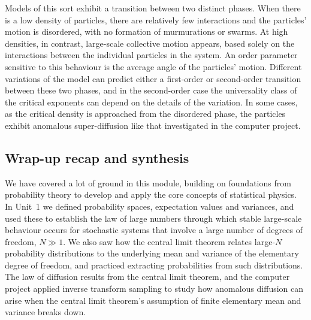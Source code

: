 Models of this sort exhibit a transition between two distinct phases.
When there is a low density of particles, there are relatively few interactions and the particles' motion is disordered, with no formation of murmurations or swarms.
At high densities, in contrast, large-scale collective motion appears, based solely on the interactions between the individual particles in the system.
An order parameter sensitive to this behaviour is the average angle of the particles' motion.
Different variations of the model can predict either a first-order or second-order transition between these two phases, and in the second-order case the universality class of the critical exponents can depend on the details of the variation. %
In some cases, as the critical density is approached from the disordered phase, the particles exhibit anomalous super-diffusion like that investigated in the computer project. %



\subsection{Wrap-up recap and synthesis}
We have covered a lot of ground in this module, building on foundations from probability theory to develop and apply the core concepts of statistical physics.
In Unit~1 we defined probability spaces, expectation values and variances, and used these to establish the law of large numbers through which stable large-scale behaviour occurs for stochastic systems that involve a large number of degrees of freedom, $N \gg 1$.
We also saw how the central limit theorem relates large-$N$ probability distributions to the underlying mean and variance of the elementary degree of freedom, and practiced extracting probabilities from such distributions.
The law of diffusion results from the central limit theorem, and the computer project applied inverse transform sampling to study how anomalous diffusion can arise when the central limit theorem's assumption of finite elementary mean and variance breaks down.

